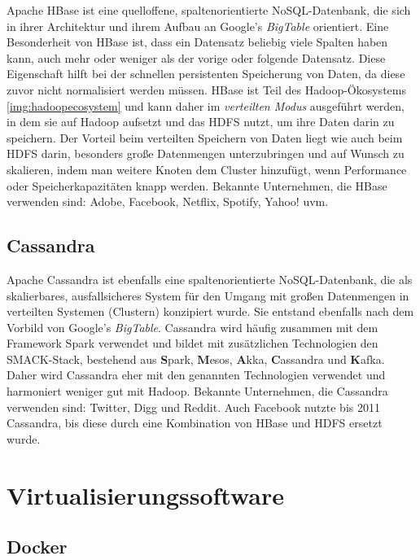 Apache HBase ist eine quelloffene, spaltenorientierte NoSQL-Datenbank, die sich in ihrer Architektur und ihrem Aufbau an Google's \textit{BigTable} orientiert. Eine Besonderheit von HBase ist, dass ein Datensatz beliebig viele Spalten haben kann, auch mehr oder weniger als der vorige oder folgende Datensatz. Diese Eigenschaft hilft bei der schnellen persistenten Speicherung von Daten, da diese zuvor nicht normalisiert werden müssen. HBase ist Teil des Hadoop-Ökosystems \ref{img:hadoopecosystem} und kann daher im \textit{verteilten Modus} ausgeführt werden, in dem sie auf Hadoop aufsetzt und das HDFS nutzt, um ihre Daten darin zu speichern. Der Vorteil beim verteilten Speichern von Daten liegt wie auch beim HDFS darin, besonders große Datenmengen unterzubringen und auf Wunsch zu skalieren, indem man weitere Knoten dem Cluster hinzufügt, wenn Performance oder Speicherkapazitäten knapp werden. Bekannte Unternehmen, die HBase verwenden sind: Adobe, Facebook, Netflix, Spotify, Yahoo! uvm.

\subsection{Cassandra}
\label{subsec:Cassandra}

Apache Cassandra ist ebenfalls eine spaltenorientierte NoSQL-Datenbank, die als skalierbares, ausfallsicheres System für den Umgang mit großen Datenmengen in verteilten Systemen (Clustern) konzipiert wurde. Sie entstand ebenfalls nach dem Vorbild von Google's \textit{BigTable}. Cassandra wird häufig zusammen mit dem Framework Spark verwendet und bildet mit zusätzlichen Technologien den SMACK-Stack, bestehend aus \textbf{S}park, \textbf{M}esos, \textbf{A}kka, \textbf{C}assandra und \textbf{K}afka. Daher wird Cassandra eher mit den genannten Technologien verwendet und harmoniert weniger gut mit Hadoop. Bekannte Unternehmen, die Cassandra verwenden sind: Twitter, Digg und Reddit. Auch Facebook nutzte bis 2011 Cassandra, bis diese durch eine Kombination von HBase und HDFS ersetzt wurde. 

\pagebreak

\section{Virtualisierungssoftware}
\label{sec:Virtualisierung}

\subsection{Docker}
\label{subsec:Docker}

